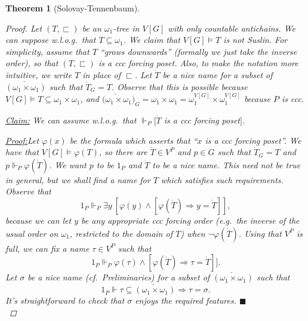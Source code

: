 \documentclass[11pt,a4paper]{report}
\newtheorem{theorem}{Theorem}[chapter] %
\theoremstyle{definition}
\theoremstyle{num.custom-title}
\theoremstyle{custom-title}
\newenvironment{claim}[1]{\par\noindent\underline{Claim#1:}\space}{} %
\newenvironment{claimproof}[1]{\par\noindent\underline{Proof:}\space#1}{\leavevmode\unskip\penalty9999 \hbox{}\nobreak\hfill\quad\hbox{$\blacksquare$}} %
\DeclareMathOperator{\imp}{\Rightarrow}
\DeclareMathOperator{\sse}{\subseteq}
\DeclareMathOperator{\restr}{\upharpoonright}
\newcommand*{\defeq}{\mathrel{\rlap{%
                     \raisebox{0.3ex}{$\cdot$}}%
                     \raisebox{-0.3ex}{$\cdot$}}%
                     =}
\renewcommand{\phi}{\varphi}
\newcommand{\forces}{\Vdash}
\begin{document}
\begin{theorem}[Solovay-Tennenbaum]
\begin{proof}
Let $(T,\sqsubset)$ be an $\omega_1$-tree in $V[G]$ with only countable antichains. We can suppose w.l.o.g.\ that $T \sse \omega_1$. We claim that $V[G] \models T$ is not Suslin. For simplicity, assume that $T$ ``grows downwards'' (formally we just take the inverse order), so that $(T,\sqsubset)$ is a ccc forcing poset. Also, to make the notation more intuitive, we write $T$ in place of $\sqsubset$. Let $\dot{T}$ be a nice name for a subset of $\check{(\omega_1 \times \omega_1)}$ such that $\dot{T}_G = T$. Observe that this is possible because $V[G] \models T \sse \omega_1 \times \omega_1$, and $\check{(\omega_1 \times \omega_1})_G = \omega_1 \times \omega_1 = \omega_1^{V[G]} \times \omega_1^{V[G]}$ because $P$ is ccc.
\\[-10pt]
\begin{claim}{}
We can assume w.l.o.g.\ that $\forces_P [\dot{T}$ is a ccc forcing poset$]$.
\begin{claimproof}
Let $\phi(x)$ be the formula which asserts that ``$x$ is a ccc forcing poset''. We have that $V[G] \models \phi(T)$, so there are $\dot{T} \in V^P$ and $p \in G$ such that $\dot{T}_G = T$ and $p \forces_P \phi(\dot{T})$. We want $p$ to be $1_P$ and $\dot{T}$ to be a nice name. This need not be true in general, but we shall find a name for $T$ which satisfies such requirements. Observe that
\[
1_P \forces_P \exists y \ [\phi(y) \wedge [\phi(\dot{T}) \imp y = \dot{T}]],
\]
because we can let $y$ be any appropriate ccc forcing order (e.g.\ the inverse of the usual order on $\omega_1$, restricted to the domain of $T$) when $\neg \phi(\dot{T})$. Using that $V^P$ is full, we can fix a name $\tau \in V^P$ such that
\[
1_P \forces_P \phi(\tau) \wedge [\phi(\dot{T}) \imp \tau = \dot{T}]].
\]
Let $\sigma$ be a nice name (cf.\ Preliminaries) for a subset of $\check{(\omega_1 \times \omega_1)}$ such that
\[
1_P \forces \tau \sse \check{(\omega_1 \times \omega_1)} \imp \tau = \sigma.
\]
It's straightforward to check that $\sigma$ enjoys the required features.
\end{claimproof}
\end{claim}
\\[6pt]

\end{proof}
\end{theorem}
\end{document}
